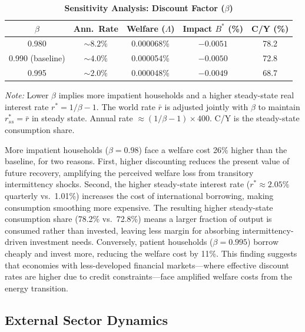 \documentclass[12pt, a4paper]{article}
\begin{document}
\begin{table}[H]
    \centering
    \caption{\textbf{Sensitivity Analysis: Discount Factor ($\beta$)}}
    \label{tab:beta_sensitivity}
    \renewcommand{\arraystretch}{1.3}
    \small
    \begin{tabular}{c c c c c}
        \toprule
        $\beta$ & \textbf{Ann.\ Rate} & \textbf{Welfare ($\Lambda$)} & \textbf{Impact $B^*$ (\%)} & \textbf{C/Y (\%)} \\
        \midrule
        0.980 & $\sim 8.2\%$ & 0.000068\% & $-0.0051$ & 78.2 \\
        0.990 (baseline) & $\sim 4.0\%$ & 0.000054\% & $-0.0050$ & 72.8 \\
        0.995 & $\sim 2.0\%$ & 0.000048\% & $-0.0049$ & 68.7 \\
        \bottomrule
    \end{tabular}
    \vspace{0.2cm}
    \parbox{\textwidth}{\footnotesize \textit{Note:} Lower $\beta$ implies more impatient households and a higher steady-state real interest rate $r^* = 1/\beta - 1$. The world rate $\bar{r}$ is adjusted jointly with $\beta$ to maintain $r^*_{ss} = \bar{r}$ in steady state. Annual rate $\approx (1/\beta - 1) \times 400$. C/Y is the steady-state consumption share.}
\end{table}

More impatient households ($\beta = 0.98$) face a welfare cost 26\% higher than the baseline, for two reasons. First, higher discounting reduces the present value of future recovery, amplifying the perceived welfare loss from transitory intermittency shocks. Second, the higher steady-state interest rate ($r^* \approx 2.05\%$ quarterly vs.\ 1.01\%) increases the cost of international borrowing, making consumption smoothing more expensive. The resulting higher steady-state consumption share (78.2\% vs.\ 72.8\%) means a larger fraction of output is consumed rather than invested, leaving less margin for absorbing intermittency-driven investment needs. Conversely, patient households ($\beta = 0.995$) borrow cheaply and invest more, reducing the welfare cost by 11\%. This finding suggests that economies with less-developed financial markets---where effective discount rates are higher due to credit constraints---face amplified welfare costs from the energy transition.

\subsection{External Sector Dynamics}
\end{document}
